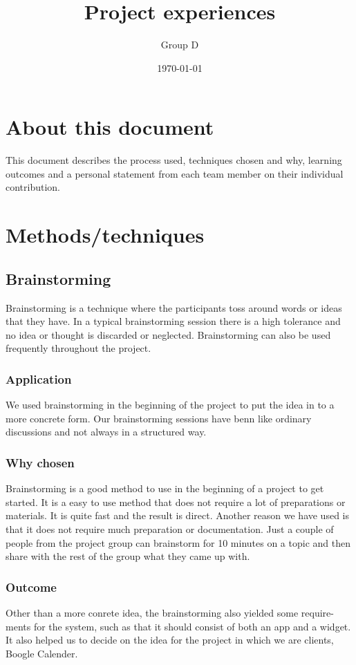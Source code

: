 \documentclass[a4paper]{article}
\title{Project experiences}
\author{Group D}
\date{\today}
\begin{document}
	\maketitle
	\thispagestyle{empty}
	\setcounter{page}{0}
	\pagebreak
	\tableofcontents
	\pagebreak
	
  \section{About this document}
  This document describes the process used, techniques chosen and why, learning
outcomes and a personal statement from each team member on their individual
contribution.
  \section{Methods/techniques}
  \subsection{Brainstorming}
Brainstorming is a technique where the participants toss around words or ideas
that they have. In a typical brainstorming session there is a high tolerance and
no idea or thought is discarded or neglected. Brainstorming can also be used
frequently throughout the project.
    \subsubsection{Application}
We used brainstorming in the beginning of the project to put the idea in to
a more concrete form. Our brainstorming sessions have benn like ordinary
discussions and not always in a structured way.
    \subsubsection{Why chosen}
Brainstorming is a good method to use in the beginning of a project to get
started. It is a easy to use method that does not require a lot of preparations or
materials. It is quite fast and the result is direct. Another reason we have used
is that it does not require much preparation or documentation. Just a couple
of people from the project group can brainstorm for 10 minutes on a topic and
then share with the rest of the group what they came up with.

    \subsubsection{Outcome}
    Other than a more conrete idea, the brainstorming also yielded some require-
ments for the system, such as that it should consist of both an app and a widget.
It also helped us to decide on the idea for the project in which we are clients,
Boogle Calender.
\end{document}
